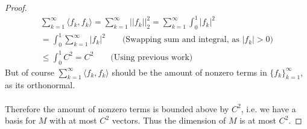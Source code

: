 \documentclass[12pt]{article}
\newenvironment{ex}[2][Exercise]{\begin{trivlist}
\item[\hskip \labelsep {\bfseries #1}\hskip \labelsep {\bfseries #2.}]}{\end{trivlist}}
\begin{document}
\begin{ex}{12}
\begin{enumerate}[label=(\alph*)]
\begin{proof}
            \begin{align}
                \sum_{k = 1}^\infty \langle f_k, f_k \rangle = \sum_{k = 1}^\infty ||f_k||_2^2 = \sum_{k = 1}^\infty \int_0^1 |f_k|^2 \\
                = \int_0^1 \sum_{k = 1}^\infty |f_k|^2 \qquad \text{(Swapping sum and integral, as } |f_k| > 0) \\
                \leq \int_0^1 C^2 = C^2 \qquad \text{(Using previous work)}
            \end{align}
            But of course $\sum_{k = 1}^\infty \langle f_k, f_k \rangle$ should be the amount of nonzero terms in $\{f_k\}_{k = 1}^\infty$, as its orthonormal. \\ \\Therefore the amount of nonzero terms is bounded above by $C^2$, i.e. we have a basis for $M$ with at most $C^2$ vectors. Thus the dimension of $M$ is at most $C^2$.
        \end{proof}
    \end{enumerate}
\end{ex}
\end{document}
